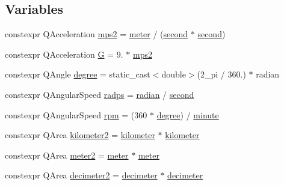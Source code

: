 \subsection*{Variables}
\begin{DoxyCompactItemize}
\item 
constexpr Q\+Acceleration \mbox{\hyperlink{namespaceokapi_a87ed91f18439f9e7e29392272f329f1c}{mps2}} = \mbox{\hyperlink{namespaceokapi_a59563b3d4b18633f1c8d852e2932d1db}{meter}} / (\mbox{\hyperlink{namespaceokapi_ae9ece1daf9cd9f6d3a597cc5c0dc7b40}{second}} $\ast$ \mbox{\hyperlink{namespaceokapi_ae9ece1daf9cd9f6d3a597cc5c0dc7b40}{second}})
\item 
constexpr Q\+Acceleration \mbox{\hyperlink{namespaceokapi_a6e00ff72f863a56a3fc99ca94f106a5a}{G}} = 9. $\ast$ \mbox{\hyperlink{namespaceokapi_a87ed91f18439f9e7e29392272f329f1c}{mps2}}
\item 
constexpr Q\+Angle \mbox{\hyperlink{namespaceokapi_a62211562b2e637742bd6e64748802211}{degree}} = static\+\_\+cast$<$double$>$(2\+\_\+pi / 360.) $\ast$ radian
\item 
constexpr Q\+Angular\+Speed \mbox{\hyperlink{namespaceokapi_aec15098b7cc08fb5c6c99faa058a1f72}{radps}} = \mbox{\hyperlink{namespaceokapi_a58aeaa1abc59d23d0790a77d53f1d26b}{radian}} / \mbox{\hyperlink{namespaceokapi_ae9ece1daf9cd9f6d3a597cc5c0dc7b40}{second}}
\item 
constexpr Q\+Angular\+Speed \mbox{\hyperlink{namespaceokapi_a44d420085fe3c46220da4b11e5827453}{rpm}} = (360 $\ast$ \mbox{\hyperlink{namespaceokapi_a62211562b2e637742bd6e64748802211}{degree}}) / \mbox{\hyperlink{namespaceokapi_abce6256db60f015cf42c2b90cda699e3}{minute}}
\item 
constexpr Q\+Area \mbox{\hyperlink{namespaceokapi_a9760b46c22212bb946c9936f6a600455}{kilometer2}} = \mbox{\hyperlink{namespaceokapi_a05acd5fc8bdc7fe19d03a5241ae4bbc7}{kilometer}} $\ast$ \mbox{\hyperlink{namespaceokapi_a05acd5fc8bdc7fe19d03a5241ae4bbc7}{kilometer}}
\item 
constexpr Q\+Area \mbox{\hyperlink{namespaceokapi_af408c7a86b7f54691246722841817248}{meter2}} = \mbox{\hyperlink{namespaceokapi_a59563b3d4b18633f1c8d852e2932d1db}{meter}} $\ast$ \mbox{\hyperlink{namespaceokapi_a59563b3d4b18633f1c8d852e2932d1db}{meter}}
\item 
constexpr Q\+Area \mbox{\hyperlink{namespaceokapi_a554ff440baa9c27432dcbc8068fbf47e}{decimeter2}} = \mbox{\hyperlink{namespaceokapi_adeefe08fd5193fd9090e198b1a3463b9}{decimeter}} $\ast$ \mbox{\hyperlink{namespaceokapi_adeefe08fd5193fd9090e198b1a3463b9}{decimeter}}

\end{DoxyCompactItemize}
